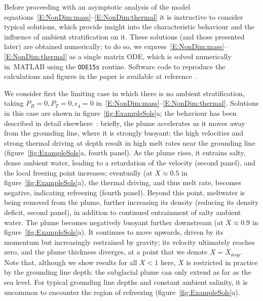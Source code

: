 \documentclass[openacc]{rsproca_new}%
\newcommand{\epsfour}{\epsilon_{4}}
\newcommand{\Pb}{\textit{P}_B}  %
\newcommand{\Pt}{\textit{P}_T}
\begin{document}
Before proceeding with an asymptotic analysis of the model equations~\eqref{E:NonDim:mass}--\eqref{E:NonDim:thermal} it is instructive to consider typical solutions, which provide insight into the characteristic behaviour and the influence of ambient stratification on it. These solutions (and those presented later) are obtained numerically; to do so, we express~\eqref{E:NonDim:mass}--\eqref{E:NonDim:thermal} as a single matrix ODE, which is solved numerically in~\textsc{MATLAB} using the \texttt{ODE15s} routine. Software code to reproduce the calculations and figures in the paper is available at reference~\cite{PycnoclineCode}.

We consider first the limiting case in which there is no ambient stratification, taking $\Pb = 0, \Pt = 0, \epsfour = 0$ in~\eqref{E:NonDim:mass}--\eqref{E:NonDim:thermal}. Solutions in this case are shown in figure~\ref{fig:ExampleSols}a; the behaviour has been described in detail elsewhere~\cite[see][for example]{Jenkins1991JGeophysResOceans, Jenkins2011JPhysOcean, Magorrian2016JGeoResOcean, Hewitt2020AnnRevFlu}: briefly, the plume accelerates as it moves away from the grounding line, where it is strongly buoyant; the high velocities and strong thermal driving at depth result in high melt rates near the grounding line (figure~\ref{fig:ExampleSols}a, fourth panel). As the plume rises, it entrains salty, dense ambient water, leading to a retardation of the velocity (second panel), and the local freezing point increases; eventually (at $X \approx 0.5$ in figure~\ref{fig:ExampleSols}a), the thermal driving, and thus melt rate, becomes negative, indicating refreezing (fourth panel). Beyond this point, meltwater is being removed from the plume, further increasing its density (reducing its density deficit, second panel), in addition to continued entrainment of salty ambient water. The plume becomes negatively buoyant further downstream (at $X \approx 0.9$ in figure~\ref{fig:ExampleSols}a). It continues to move upwards, driven by its momentum but increasingly restrained by gravity; its velocity ultimately reaches zero, and the plume thickness diverges, at a point that we denote $X = X_{\text{stop}}$. Note that, although we show results for all $X < 1$ here, $X$ is restricted in practice by the grounding line depth: the subglacial plume can only extend as far as the sea level. For typical grounding line depths and constant ambient salinity, it is uncommon to encounter the region of refreezing (figure~\ref{fig:ExampleSols}a). 
\end{document}
